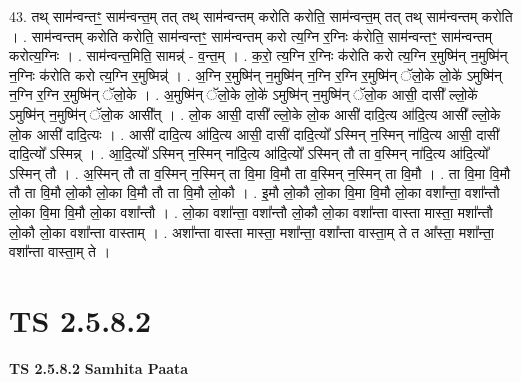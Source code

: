 \documentclass[17pt]{extarticle}
\begin{document}
43. तथ् साम॑न्वन्तꣳ॒॒ साम॑न्वन्त॒म् तत् तथ् साम॑न्वन्तम् करोति करोति॒ साम॑न्वन्त॒म् तत् तथ् साम॑न्वन्तम् करोति । . साम॑न्वन्तम् करोति करोति॒ साम॑न्वन्तꣳ॒॒ साम॑न्वन्तम् करो त्य॒ग्नि र॒ग्निः क॑रोति॒ साम॑न्वन्तꣳ॒॒ साम॑न्वन्तम् करोत्य॒ग्निः । . साम॑न्वन्त॒मिति॒ सामन्न्॑ - व॒न्त॒म् । . क॒रो॒ त्य॒ग्नि र॒ग्निः क॑रोति करो त्य॒ग्नि र॒मुष्मि॑न् न॒मुष्मि॑न् न॒ग्निः क॑रोति करो त्य॒ग्नि र॒मुष्मिन्न्॑ । . अ॒ग्नि र॒मुष्मि॑न् न॒मुष्मि॑न् न॒ग्नि र॒ग्नि र॒मुष्मि॑न् ॅलो॒के लो॒के॑ ऽमुष्मि॑न् न॒ग्नि र॒ग्नि र॒मुष्मि॑न् ॅलो॒के । . अ॒मुष्मि॑न् ॅलो॒के लो॒के॑ ऽमुष्मि॑न् न॒मुष्मि॑न् ॅलो॒क आसी॒ दासी᳚ ल्लो॒के॑ ऽमुष्मि॑न् न॒मुष्मि॑न् ॅलो॒क आसी᳚त् । . लो॒क आसी॒ दासी᳚ ल्लो॒के लो॒क आसी॑ दादि॒त्य आ॑दि॒त्य आसी᳚ ल्लो॒के लो॒क आसी॑ दादि॒त्यः । . आसी॑ दादि॒त्य आ॑दि॒त्य आसी॒ दासी॑ दादि॒त्यो᳚ ऽस्मिन् न॒स्मिन् ना॑दि॒त्य आसी॒ दासी॑ दादि॒त्यो᳚ ऽस्मिन्न् । . आ॒दि॒त्यो᳚ ऽस्मिन् न॒स्मिन् ना॑दि॒त्य आ॑दि॒त्यो᳚ ऽस्मिन् तौ ता व॒स्मिन् ना॑दि॒त्य आ॑दि॒त्यो᳚ ऽस्मिन् तौ । . अ॒स्मिन् तौ ता व॒स्मिन् न॒स्मिन् ता वि॒मा वि॒मौ ता व॒स्मिन् न॒स्मिन् ता वि॒मौ । . ता वि॒मा वि॒मौ तौ ता वि॒मौ लो॒कौ लो॒का वि॒मौ तौ ता वि॒मौ लो॒कौ । . इ॒मौ लो॒कौ लो॒का वि॒मा वि॒मौ लो॒का वशा᳚न्ता॒ वशा᳚न्तौ लो॒का वि॒मा वि॒मौ लो॒का वशा᳚न्तौ । . लो॒का वशा᳚न्ता॒ वशा᳚न्तौ लो॒कौ लो॒का वशा᳚न्ता वास्ता मास्ता॒ मशा᳚न्तौ लो॒कौ लो॒का वशा᳚न्ता वास्ताम् । . अशा᳚न्ता वास्ता मास्ता॒ मशा᳚न्ता॒ वशा᳚न्ता वास्ता॒म् ते त आ᳚स्ता॒ मशा᳚न्ता॒ वशा᳚न्ता वास्ता॒म् ते । \newline
\pagebreak
{}

\section{ TS 2.5.8.2 }

\textbf{TS 2.5.8.2 } \newline
\textbf{Samhita Paata} \newline
\end{document}
